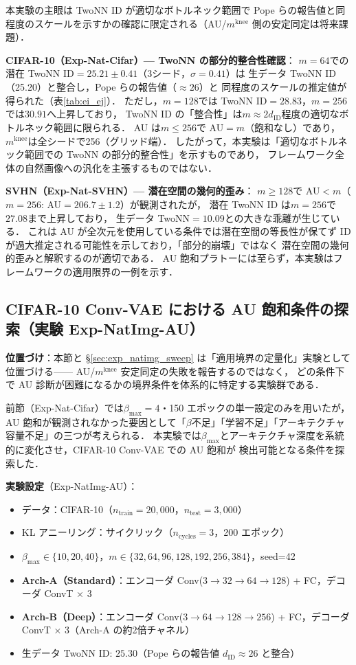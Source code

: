 \documentclass[11pt,a4paper]{jsarticle}
\newcommand{\mknee}{m^{\mathrm{knee}}}
\begin{document}
本実験の主眼は TwoNN ID が適切なボトルネック範囲で Pope らの報告値と同程度のスケールを示すかの確認に限定される（AU/$\mknee$ 側の安定同定は将来課題）．

\textbf{CIFAR-10（Exp-Nat-Cifar）— TwoNN の部分的整合性確認}：
$m=64$での潜在 TwoNN ID$=25.21\pm0.41$（3シード，$\sigma=0.41$）は
生データ TwoNN ID（25.20）と整合し，Pope ら\cite{pope2021intrinsic}の報告値（$\approx 26$）と
同程度のスケールの推定値が得られた（表\ref{tab:ei_ej}）．
ただし，$m=128$では TwoNN ID$=28.83$，$m=256$では$30.91$へ上昇しており，
TwoNN ID の「整合性」は$m \approx 2\hat{d}_\mathrm{ID}$程度の適切なボトルネック範囲に限られる．
AU は$m \leq 256$で AU$=m$（飽和なし）であり，$\mknee$は全シードで256（グリッド端）．
したがって，本実験は「適切なボトルネック範囲での TwoNN の部分的整合性」を示すものであり，
フレームワーク全体の自然画像への汎化を主張するものではない．

\textbf{SVHN（Exp-Nat-SVHN）— 潜在空間の幾何的歪み}：
$m \geq 128$で AU$<m$（$m=256$: AU$=206.7\pm1.2$）が観測されたが，
潜在 TwoNN ID は$m=256$で$27.08$まで上昇しており，
生データ TwoNN$=10.09$との大きな乖離が生じている．
これは AU が全次元を使用している条件では潜在空間の等長性が保てず
ID が過大推定される可能性を示しており，「部分的崩壊」ではなく
潜在空間の幾何的歪みと解釈するのが適切である．
AU 飽和プラトーには至らず，本実験はフレームワークの適用限界の一例を示す．

\subsection{CIFAR-10 Conv-VAE における AU 飽和条件の探索（実験 Exp-NatImg-AU）}\label{sec:exp_natimg_au}

\textbf{位置づけ}：本節と §\ref{sec:exp_natimg_sweep} は「適用境界の定量化」実験として位置づける——
AU/$\mknee$ 安定同定の失敗を報告するのではなく，
どの条件下で AU 診断が困難になるかの境界条件を体系的に特定する実験群である．

前節（Exp-Nat-Cifar）では$\beta_{\max}=4$・150 エポックの単一設定のみを用いたが，
AU 飽和が観測されなかった要因として「$\beta$不足」「学習不足」「アーキテクチャ容量不足」の三つが考えられる．
本実験では$\beta_{\max}$とアーキテクチャ深度を系統的に変化させ，CIFAR-10 Conv-VAE での AU 飽和が
検出可能となる条件を探索した．

\textbf{実験設定}（Exp-NatImg-AU）：
\begin{itemize}
  \item データ：CIFAR-10（$n_{\mathrm{train}}=20{,}000$，$n_{\mathrm{test}}=3{,}000$）
  \item KL アニーリング：サイクリック（$n_{\mathrm{cycles}}=3$，200 エポック）
  \item $\beta_{\max} \in \{10, 20, 40\}$，$m \in \{32, 64, 96, 128, 192, 256, 384\}$，seed=42
  \item \textbf{Arch-A（Standard）}：エンコーダ Conv($3{\to}32{\to}64{\to}128$) + FC，デコーダ ConvT × 3
  \item \textbf{Arch-B（Deep）}：エンコーダ Conv($3{\to}64{\to}128{\to}256$) + FC，デコーダ ConvT × 3（Arch-A の約2倍チャネル）
  \item 生データ TwoNN ID: $25.30$（Pope ら\cite{pope2021intrinsic}の報告値 $d_\mathrm{ID} \approx 26$ と整合）
\end{itemize}
\end{document}

